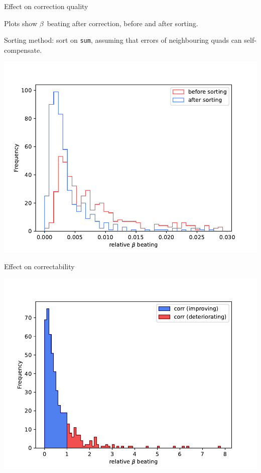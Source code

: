 \documentclass[usenames,dvipsnames,aspectratio=169,table]{beamer}
\begin{document}
\begin{frame} %
    {Effect on correction quality}


    Plots show $\beta$~beating after correction, before and after sorting.

    Sorting method: sort on \texttt{sum}, assuming that errors of neighbouring quads can self-compensate.
    
    \begin{center}
        \includegraphics[width=0.5\linewidth]{recon_threshold.pdf}
    \end{center}

\end{frame} %

\begin{frame} %
    {Effect on correctability}

    

    \begin{center}
    \includegraphics[width=0.6\linewidth]{corr_threshold.pdf}
    \end{center}

\end{frame} %
\end{document}
